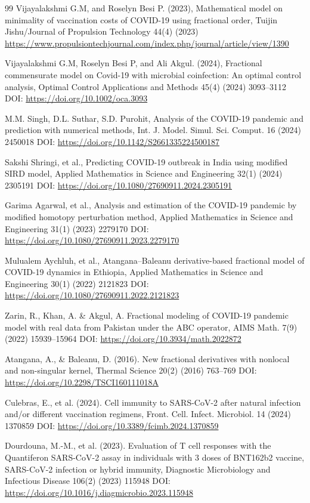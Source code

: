 \documentclass[10pt]{NSP1}
\begin{document}
\begin{thebibliography}{99}
Vijayalakshmi G.M, and Roselyn Besi P. (2023), Mathematical model on minimality of vaccination costs of COVID-19 using fractional order, Tuijin Jishu/Journal of Propulsion Technology 44(4) (2023) \url{https://www.propulsiontechjournal.com/index.php/journal/article/view/1390}

Vijayalakshmi G.M, Roselyn Besi P, and Ali Akgul. (2024), Fractional commensurate model on Covid-19 with microbial coinfection: An optimal control analysis, Optimal Control Applications and Methods 45(4) (2024) 3093--3112 DOI: \url{https://doi.org/10.1002/oca.3093}

M.M. Singh, D.L. Suthar, S.D. Purohit, Analysis of the COVID-19 pandemic and prediction with numerical methods, Int. J. Model. Simul. Sci. Comput. 16 (2024) 2450018 DOI: \url{https://doi.org/10.1142/S2661335224500187}

Sakshi Shringi, et al., Predicting COVID-19 outbreak in India using modified SIRD model, Applied Mathematics in Science and Engineering 32(1) (2024) 2305191 DOI: \url{https://doi.org/10.1080/27690911.2024.2305191}

Garima Agarwal, et al., Analysis and estimation of the COVID-19 pandemic by modified homotopy perturbation method, Applied Mathematics in Science and Engineering 31(1) (2023) 2279170 DOI: \url{https://doi.org/10.1080/27690911.2023.2279170}

Mulualem Aychluh, et al., Atangana--Baleanu derivative-based fractional model of COVID-19 dynamics in Ethiopia, Applied Mathematics in Science and Engineering 30(1) (2022) 2121823 DOI: \url{https://doi.org/10.1080/27690911.2022.2121823}

Zarin, R., Khan, A. \& Akgul, A. Fractional modeling of COVID-19 pandemic model with real data from Pakistan under the ABC operator, AIMS Math. 7(9) (2022) 15939--15964 DOI: \url{https://doi.org/10.3934/math.2022872}

Atangana, A., \& Baleanu, D. (2016). New fractional derivatives with nonlocal and non-singular kernel, Thermal Science 20(2) (2016) 763--769 DOI: \url{https://doi.org/10.2298/TSCI160111018A}

Culebras, E., et al. (2024). Cell immunity to SARS-CoV-2 after natural infection and/or different vaccination regimens, Front. Cell. Infect. Microbiol. 14 (2024) 1370859 DOI: \url{https://doi.org/10.3389/fcimb.2024.1370859}

Dourdouna, M.-M., et al. (2023). Evaluation of T cell responses with the Quantiferon SARS-CoV-2 assay in individuals with 3 doses of BNT162b2 vaccine, SARS-CoV-2 infection or hybrid immunity, Diagnostic Microbiology and Infectious Disease 106(2) (2023) 115948 DOI: \url{https://doi.org/10.1016/j.diagmicrobio.2023.115948}


\end{thebibliography}
\end{document}

